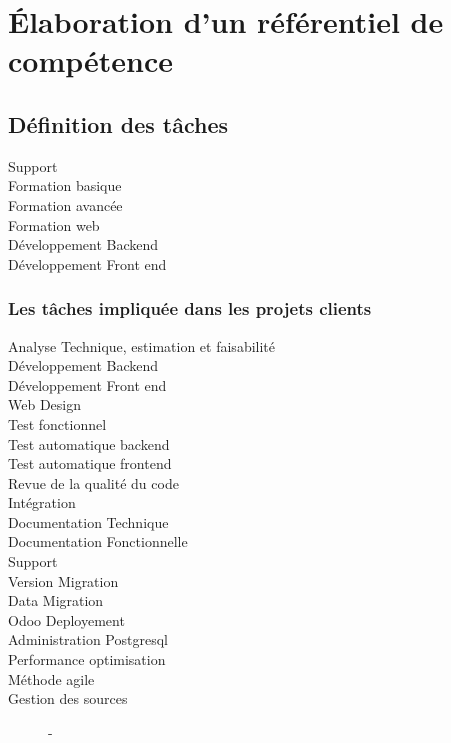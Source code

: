 \chapter{Élaboration d'un référentiel de compétence}
\section{Définition des tâches}

\begin{description}
    \item[Support] 
    \item[Formation basique]
    \item[Formation avancée]
    \item[Formation web]
    \item[Développement Backend]
    \item[Développement Front end]
    
\end{description}

\subsection{Les tâches impliquée dans les projets clients}
\begin{description}
    \item[Analyse Technique, estimation et faisabilité] 
    \item[Développement Backend]
    \item[Développement Front end]
    \item[Web Design]
    \item[Test fonctionnel]
    \item[Test automatique backend]
    \item[Test automatique frontend]
    \item[Revue de la qualité du code]
    \item[Intégration]
    \item[Documentation Technique]
    \item[Documentation Fonctionnelle]
    \item[Support]
    \item[Version Migration]
    \item[Data Migration]
    \item[Odoo Deployement]
    \item[Administration Postgresql]
    \item[Performance optimisation]
    \item[Méthode agile] 
    \item[Gestion des sources] -
\end{description}



